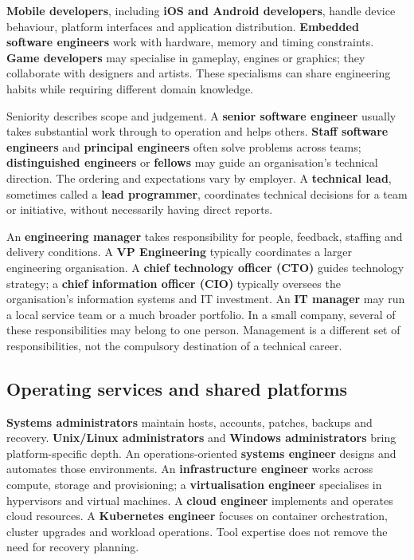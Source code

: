 \textbf{Mobile developers}, including \textbf{iOS and Android developers}, handle device behaviour, platform interfaces and application distribution. \textbf{Embedded software engineers} work with hardware, memory and timing constraints. \textbf{Game developers} may specialise in gameplay, engines or graphics; they collaborate with designers and artists. These specialisms can share engineering habits while requiring different domain knowledge.


Seniority describes scope and judgement. A \textbf{senior software engineer} usually takes substantial work through to operation and helps others. \textbf{Staff software engineers} and \textbf{principal engineers} often solve problems across teams; \textbf{distinguished engineers} or \textbf{fellows} may guide an organisation's technical direction. The ordering and expectations vary by employer. A \textbf{technical lead}, sometimes called a \textbf{lead programmer}, coordinates technical decisions for a team or initiative, without necessarily having direct reports.


An \textbf{engineering manager} takes responsibility for people, feedback, staffing and delivery conditions. A \textbf{VP Engineering} typically coordinates a larger engineering organisation. A \textbf{chief technology officer (CTO)} guides technology strategy; a \textbf{chief information officer (CIO)} typically oversees the organisation's information systems and IT investment. An \textbf{IT manager} may run a local service team or a much broader portfolio. In a small company, several of these responsibilities may belong to one person. Management is a different set of responsibilities, not the compulsory destination of a technical career.



\subsection{Operating services and shared platforms}


\textbf{Systems administrators} maintain hosts, accounts, patches, backups and recovery. \textbf{Unix/Linux administrators} and \textbf{Windows administrators} bring platform-specific depth. An operations-oriented \textbf{systems engineer} designs and automates those environments. An \textbf{infrastructure engineer} works across compute, storage and provisioning; a \textbf{virtualisation engineer} specialises in hypervisors and virtual machines. A \textbf{cloud engineer} implements and operates cloud resources. A \textbf{Kubernetes engineer} focuses on container orchestration, cluster upgrades and workload operations. Tool expertise does not remove the need for recovery planning.


